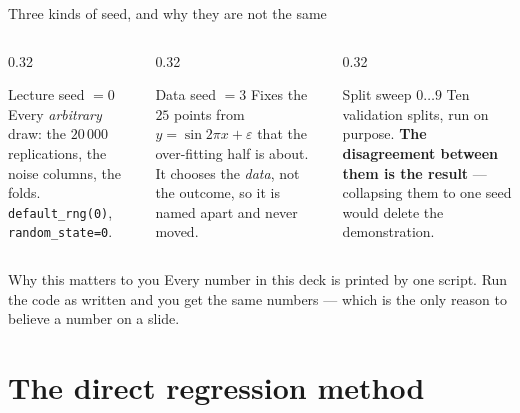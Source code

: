 \documentclass[aspectratio=169]{beamer}
\begin{document}
\begin{frame}[shrink=6]{Three kinds of seed, and why they are not the same}
  \begin{columns}[T]
    \begin{column}{0.32\textwidth}
      \begin{block}{Lecture seed $=0$}
        \small Every \emph{arbitrary} draw: the $20\,000$ replications, the
        noise columns, the folds. \texttt{default\_rng(0)},
        \texttt{random\_state=0}.
      \end{block}
    \end{column}
    \begin{column}{0.32\textwidth}
      \begin{block}{Data seed $=3$}
        \small Fixes the $25$ points from $y=\sin 2\pi x+\varepsilon$ that the
        over-fitting half is about. It chooses the \emph{data}, not the
        outcome, so it is named apart and never moved.
      \end{block}
    \end{column}
    \begin{column}{0.32\textwidth}
      \begin{alertblock}{Split sweep $0\ldots9$}
        \small Ten validation splits, run on purpose. \textbf{The
        disagreement between them is the result} --- collapsing them to one
        seed would delete the demonstration.
      \end{alertblock}
    \end{column}
  \end{columns}
  \vspace{0.4em}
  \begin{exampleblock}{Why this matters to you}
    \centering\small
    Every number in this deck is printed by one script. Run the code as
    written and you get the same numbers --- which is the only reason to
    believe a number on a slide.
  \end{exampleblock}
\end{frame}

\section[Direct]{The direct regression method}
\label{sec:direct}
\end{document}
